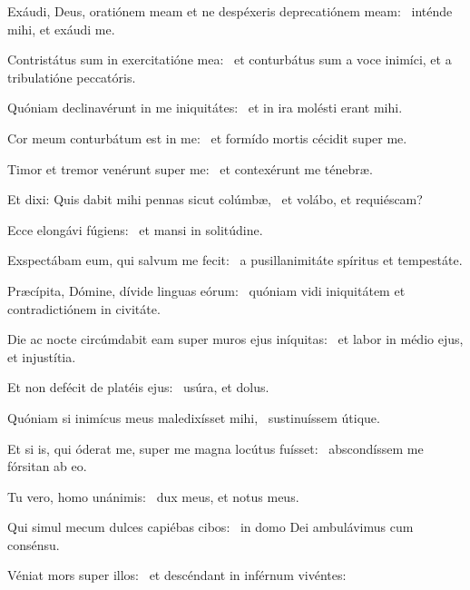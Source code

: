 \item Exáudi, Deus, oratiónem meam et ne despéxeris deprecatiónem meam:~\psstar{} inténde mihi, et exáudi me.

\item Contristátus sum in exercitatióne mea:~\psstar{} et conturbátus sum a voce inimíci, et a tribulatióne peccatóris.

\item Quóniam declinavérunt in me iniquitátes:~\psstar{} et in ira molésti erant mihi.

\item Cor meum conturbátum est in me:~\psstar{} et formído mortis cécidit super me.

\item Timor et tremor venérunt super me:~\psstar{} et contexérunt me ténebræ.

\item Et dixi: Quis dabit mihi pennas sicut colúmbæ,~\psstar{} et volábo, et requiéscam?

\item Ecce elongávi fúgiens:~\psstar{} et mansi in solitúdine.

\item Exspectábam eum, qui salvum me fecit:~\psstar{} a pusillanimitáte spíritus et tempestáte.

\item Præcípita, Dómine, dívide linguas eórum:~\psstar{} quóniam vidi iniquitátem et contradictiónem in civitáte.

\item Die ac nocte circúmdabit eam super muros ejus iníquitas:~\psstar{} et labor in médio ejus, et injustítia.

\item Et non defécit de platéis ejus:~\psstar{} usúra, et dolus.

\item Quóniam si inimícus meus maledixísset mihi,~\psstar{} sustinuíssem útique.

\item Et si is, qui óderat me, super me magna locútus fuísset:~\psstar{} abscondíssem me fórsitan ab eo.

\item Tu vero, homo unánimis:~\psstar{} dux meus, et notus meus.

\item Qui simul mecum dulces capiébas cibos:~\psstar{} in domo Dei ambulávimus cum consénsu.

\item Véniat mors super illos:~\psstar{} et descéndant in inférnum vivéntes:

